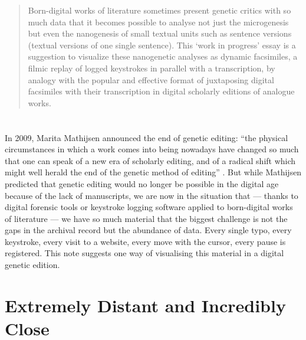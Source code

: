 

\begin{paper}
\label{vanhullewip}
\begin{abstract}
Born-digital works of literature sometimes present genetic critics with so much data that it becomes possible to analyse not just the microgenesis but even the nanogenesis of small textual units such as sentence versions (textual versions of one single sentence). This ‘work in progress’ essay is a suggestion to visualize these nanogenetic analyses as dynamic facsimiles, a filmic replay of logged keystrokes in parallel with a transcription, by analogy with the popular and effective format of juxtaposing digital facsimiles with their transcription in digital scholarly editions of analogue works.
\end{abstract}

\section*{} 
In 2009, Marita Mathijsen announced the end of genetic editing: ``the
physical circumstances in which a work comes into being nowadays have
changed so much that one can speak of a new era of scholarly editing,
and of a radical shift which might well herald the end of the genetic
method of editing'' \citep[234]{mathijsen_genetic_2009}. But while Mathijsen predicted
that genetic editing would no longer be possible in the digital age
because of the lack of manuscripts, we are now in the situation that ---
thanks to digital forensic tools \citep{kirschenbaum_track_2016,kirschenbaum_tracking_2013,ries_rationale_2018,lebrave_computer_2011} or keystroke logging software
applied to born-digital works of literature --- we have so much material
that the biggest challenge is not the gaps in the archival record but
the abundance of data. Every single typo, every keystroke, every visit
to a website, every move with the cursor, every pause is registered.
This note suggests one way of visualising this material in a digital
genetic edition.

\section*{Extremely Distant and Incredibly Close}


\end{paper}
